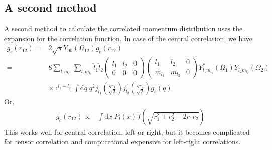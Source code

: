 \documentclass[notitlepage,a4paper,final,amsfonts,amsmath,amssymb]{revtex4-1}
\begin{document}
\subsection{A second method}
A second method to calculate the correlated momentum distribution uses the expansion for the correlation function. In case of the central correlation, we have
\begin{align}
  g_c(r_{12}) =  {} &2 \sqrt{\pi} Y_{00}(\Omega_{12}) g_c(r_{12})
  \nonumber \\ 
  =  {} & 8 \sum_{l_1 m_{l_1}} \sum_{l_2 m_{l_2}} \hat{l}_1 \hat{l}_2 
  \begin{pmatrix}
    l_1 & l_2 & 0 \\
    0 & 0 & 0
  \end{pmatrix}
  \begin{pmatrix}
    l_1 & l_2 & 0 \\
    m_{l_1} & m_{l_2} & 0
  \end{pmatrix}
  Y_{l_1 m_{l_1}}^*(\Omega_1)
  Y_{l_2 m_{l_2}}(\Omega_2)
  \nonumber \\ & \times
  \imath^{l_1-l_2}
  \int \mathrm{d}q \; q^2 j_{l_1}(\frac{qr_1}{\sqrt{2}}) j_{l_2}(\frac{qr_2}{\sqrt{2}})
  g_c(q) 
\end{align}
Or, 
\begin{align}
  g_c(r_{12}) \propto  {} &
  \int \mathrm{d}x \; P_l(x) f(\sqrt{r_1^2+r_2^2-2r_1r_2})
\end{align}
This works well for central correlation, left or right, but it becomes complicated for
tensor correlation and computational expensive for left-right correlations.
\end{document}
